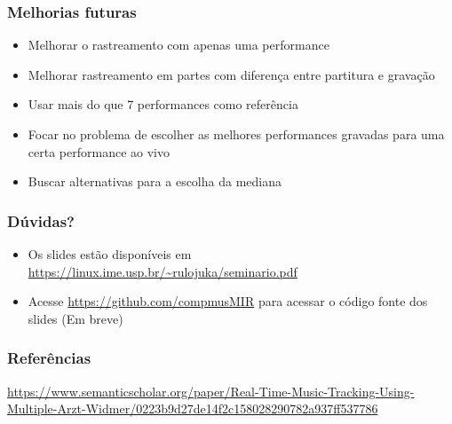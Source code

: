 \begin{frame}
  \frametitle{Melhorias futuras}
  \begin{itemize}
    \item Melhorar o rastreamento com apenas uma performance\pause
    \item Melhorar rastreamento em partes com diferença entre partitura e gravação \pause
    \item Usar mais do que 7 performances como referência \pause
    \item Focar no problema de escolher as melhores performances gravadas para uma certa performance ao vivo \pause
    \item Buscar alternativas para a escolha da mediana
  \end{itemize}
\end{frame}

\begin{frame}
  \frametitle{Dúvidas?}
  \begin{itemize}
    \item Os slides estão disponíveis em \url{https://linux.ime.usp.br/~rulojuka/seminario.pdf}
    \item Acesse \url{https://github.com/compmusMIR} para acessar o código fonte dos slides (Em breve)
  \end{itemize}
\end{frame}

\begin{frame}
  \frametitle{Referências}
  \small
  \url{https://www.semanticscholar.org/paper/Real-Time-Music-Tracking-Using-Multiple-Arzt-Widmer/0223b9d27de14f2c158028290782a937ff537786}


\end{frame}
